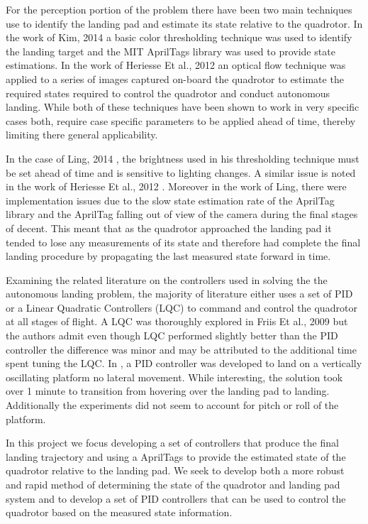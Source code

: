 \documentclass[11pt, twocolumn]{article}
\begin{document}
For the perception portion of the problem there have been two main techniques use to identify the landing pad and estimate its state relative to the quadrotor. In the work of Kim, 2014 \cite{Kim2014} a basic color thresholding technique was used to identify the landing target and the MIT AprilTags library \cite{apriltags} was used to provide state estimations. In the work of Heriesse Et al., 2012 \cite{Herisse2012} an optical flow technique was applied to a series of images captured on-board the quadrotor to estimate the required states required to control the quadrotor and conduct autonomous landing. While both of these techniques have been shown to work in very specific cases both, require case specific parameters to be applied ahead of time, thereby limiting there general applicability. 

In the case of Ling, 2014 \cite{Kim2014}, the brightness used in his thresholding technique must be set ahead of time and is sensitive to lighting changes. A similar issue is noted in the work of Heriesse Et al., 2012 \cite{Herisse2012}. Moreover in the work of Ling, there were implementation issues due to the slow state estimation rate of the AprilTag library and the AprilTag falling out of view of the camera during the final stages of decent. This meant that as the quadrotor approached the landing pad it tended to lose any measurements of its state and therefore had complete the final landing procedure by propagating the last measured state forward in time. 

Examining the related literature on the controllers used in solving the the autonomous landing problem, the majority of literature either uses a set of PID or a Linear Quadratic Controllers (LQC) to command and control the quadrotor at all stages of flight. A LQC was thoroughly explored in Friis Et al., 2009 \cite{Friis2009} but the authors admit even though LQC performed slightly better than the PID controller the difference was minor and may be attributed to the additional time spent tuning the LQC. In \cite{Herisse2012}, a PID controller was developed to land on a vertically oscillating platform no lateral movement. While interesting, the solution took over 1 minute to transition from hovering over the landing pad to landing. Additionally the experiments did not seem to account for pitch or roll of the platform. 

In this project we focus developing a set of controllers that produce the final landing trajectory and using a  AprilTags \cite{apriltags} to provide the estimated state of the quadrotor relative to the landing pad. We seek to develop both a more robust and rapid method of determining the state of the quadrotor and landing pad system and to develop a set of PID controllers that can be used to control the quadrotor based on the measured state information.
\end{document}
